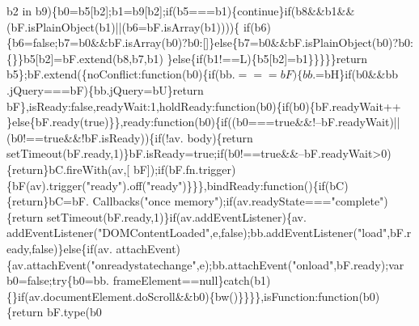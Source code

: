 \begin{DoxyCode}
      b2 in b9)\{b0=b5[b2];b1=b9[b2];\textcolor{keywordflow}{if}(b5===b1)\{\textcolor{keywordflow}{continue}\}\textcolor{keywordflow}{if}(b8&&b1&&(bF.isPlainObject(b1)||(b6=bF.isArray(b1))))\{\textcolor{keywordflow}{
      if}(b6)\{b6=\textcolor{keyword}{false};b7=b0&&bF.isArray(b0)?b0:[]\}\textcolor{keywordflow}{else}\{b7=b0&&bF.isPlainObject(b0)?b0:\{\}\}b5[b2]=bF.extend(b8,b7,b1)
      \}\textcolor{keywordflow}{else}\{\textcolor{keywordflow}{if}(b1!==L)\{b5[b2]=b1\}\}\}\}\}\textcolor{keywordflow}{return} b5\};bF.extend(\{noConflict:\textcolor{keyword}{function}(b0)\{\textcolor{keywordflow}{if}(bb.$===bF)\{bb.$=bH\}\textcolor{keywordflow}{if}(b0&&bb
      .jQuery===bF)\{bb.jQuery=bU\}\textcolor{keywordflow}{return} bF\},isReady:\textcolor{keyword}{false},readyWait:1,holdReady:\textcolor{keyword}{function}(b0)\{\textcolor{keywordflow}{if}(b0)\{bF.readyWait++
      \}\textcolor{keywordflow}{else}\{bF.ready(\textcolor{keyword}{true})\}\},ready:\textcolor{keyword}{function}(b0)\{\textcolor{keywordflow}{if}((b0===\textcolor{keyword}{true}&&!--bF.readyWait)||(b0!==\textcolor{keyword}{true}&&!bF.isReady))\{\textcolor{keywordflow}{if}(!av.
      body)\{\textcolor{keywordflow}{return} setTimeout(bF.ready,1)\}bF.isReady=\textcolor{keyword}{true};\textcolor{keywordflow}{if}(b0!==\textcolor{keyword}{true}&&--bF.readyWait>0)\{\textcolor{keywordflow}{return}\}bC.fireWith(av,[
      bF]);\textcolor{keywordflow}{if}(bF.fn.trigger)\{bF(av).trigger(\textcolor{stringliteral}{"ready"}).off(\textcolor{stringliteral}{"ready"})\}\}\},bindReady:\textcolor{keyword}{function}()\{\textcolor{keywordflow}{if}(bC)\{\textcolor{keywordflow}{return}\}bC=bF.
      Callbacks(\textcolor{stringliteral}{"once memory"});\textcolor{keywordflow}{if}(av.readyState===\textcolor{stringliteral}{"complete"})\{\textcolor{keywordflow}{return} setTimeout(bF.ready,1)\}\textcolor{keywordflow}{if}(av.addEventListener)\{av.
      addEventListener(\textcolor{stringliteral}{"DOMContentLoaded"},e,\textcolor{keyword}{false});bb.addEventListener(\textcolor{stringliteral}{"load"},bF.ready,\textcolor{keyword}{false})\}\textcolor{keywordflow}{else}\{\textcolor{keywordflow}{if}(av.
      attachEvent)\{av.attachEvent(\textcolor{stringliteral}{"onreadystatechange"},e);bb.attachEvent(\textcolor{stringliteral}{"onload"},bF.ready);var b0=\textcolor{keyword}{false};\textcolor{keywordflow}{try}\{b0=bb.
      frameElement==null\}\textcolor{keywordflow}{catch}(b1)\{\}\textcolor{keywordflow}{if}(av.documentElement.doScroll&&b0)\{bw()\}\}\}\},isFunction:\textcolor{keyword}{function}(b0)\{\textcolor{keywordflow}{return} bF.type(b0

\end{DoxyCode}
